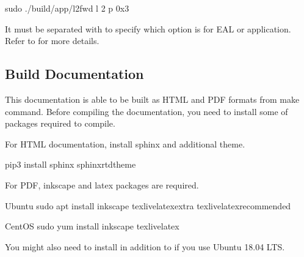 \documentclass[a4paper,11pt,openany,oneside,english]{sphinxmanual}
\begin{document}
\begin{sphinxVerbatim}[commandchars=\\\{\},formatcom=\footnotesize]
 sudo ./build/app/l2fwd 
  \PYGZhy{}l \PYGZhy{}2 
  \PYGZhy{}\PYGZhy{} \PYGZhy{}p 0x3
\end{sphinxVerbatim}

It must be separated with \sphinxcode{\sphinxupquote{-{-}}} to specify which option is
for EAL or application.
Refer to 
for more details.


\subsection{Build Documentation}
\label{\detokenize{gsg/install:build-documentation}}
This documentation is able to be built as HTML and PDF formats from make
command. Before compiling the documentation, you need to install some of
packages required to compile.

For HTML documentation, install sphinx and additional theme.

\begin{sphinxVerbatim}[commandchars=\\\{\},formatcom=\footnotesize]
 pip3 install sphinx 
  sphinx\PYGZhy{}rtd\PYGZhy{}theme
\end{sphinxVerbatim}

For PDF, inkscape and latex packages are required.

\begin{sphinxVerbatim}[commandchars=\\\{\},formatcom=\footnotesize]
 Ubuntu
 sudo apt install inkscape 
  texlive\PYGZhy{}latex\PYGZhy{}extra 
  texlive\PYGZhy{}latex\PYGZhy{}recommended
\end{sphinxVerbatim}

\begin{sphinxVerbatim}[commandchars=\\\{\},formatcom=\footnotesize]
 CentOS
 sudo yum install inkscape 
  texlive\PYGZhy{}latex
\end{sphinxVerbatim}

You might also need to install  in addition to if you use
Ubuntu 18.04 LTS.
\end{document}
